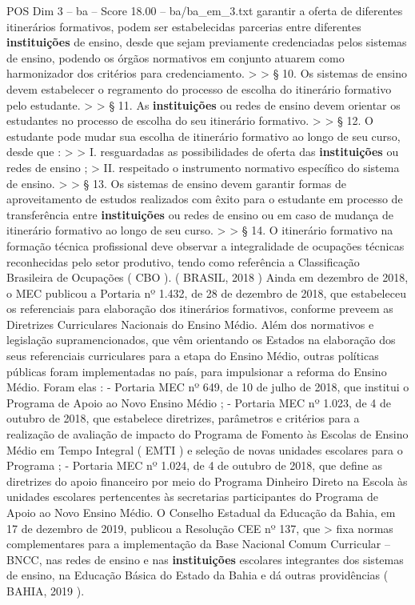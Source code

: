 \begin{textsample}{POS Dim 3 – ba – Score 18.00 – ba/ba\_em\_3.txt}
garantir a oferta de diferentes itinerários formativos, podem ser estabelecidas parcerias entre diferentes \textbf{instituições} de ensino, desde que sejam previamente credenciadas pelos sistemas de ensino, podendo os órgãos normativos em conjunto atuarem como harmonizador dos critérios para credenciamento. > > § 10.
Os sistemas de ensino devem estabelecer o regramento do processo de escolha do itinerário formativo pelo estudante. > > § 11.
As \textbf{instituições} ou redes de ensino devem orientar os estudantes no processo de escolha do seu itinerário formativo. > > § 12.
O estudante pode mudar sua escolha de itinerário formativo ao longo de seu curso, desde que : > > I. resguardadas as possibilidades de oferta das \textbf{instituições} ou redes de ensino ; > II. respeitado o instrumento normativo específico do sistema de ensino. > > § 13.
Os sistemas de ensino devem garantir formas de aproveitamento de estudos realizados com êxito para o estudante em processo de transferência entre \textbf{instituições} ou redes de ensino ou em caso de mudança de itinerário formativo ao longo de seu curso. > > § 14.
O itinerário formativo na formação técnica profissional deve observar a integralidade de ocupações técnicas reconhecidas pelo setor produtivo, tendo como referência a Classificação Brasileira de Ocupações ( CBO ). ( BRASIL, 2018 ) Ainda em dezembro de 2018, o MEC publicou a Portaria nº 1.432, de 28 de dezembro de 2018, que estabeleceu os referenciais para elaboração dos itinerários formativos, conforme preveem as Diretrizes Curriculares Nacionais do Ensino Médio.
Além dos normativos e legislação supramencionados, que vêm orientando os Estados na elaboração dos seus referenciais curriculares para a etapa do Ensino Médio, outras políticas públicas foram implementadas no país, para impulsionar a reforma do Ensino Médio.
Foram elas : - Portaria MEC nº 649, de 10 de julho de 2018, que institui o Programa de Apoio ao Novo Ensino Médio ; - Portaria MEC nº 1.023, de 4 de outubro de 2018, que estabelece diretrizes, parâmetros e critérios para a realização de avaliação de impacto do Programa de Fomento às Escolas de Ensino Médio em Tempo Integral ( EMTI ) e seleção de novas unidades escolares para o Programa ; - Portaria MEC nº 1.024, de 4 de outubro de 2018, que define as diretrizes do apoio financeiro por meio do Programa Dinheiro Direto na Escola às unidades escolares pertencentes às secretarias participantes do Programa de Apoio ao Novo Ensino Médio.
O Conselho Estadual da Educação da Bahia, em 17 de dezembro de 2019, publicou a Resolução CEE nº 137, que > fixa normas complementares para a implementação da Base Nacional Comum Curricular – BNCC, nas redes de ensino e nas \textbf{instituições} escolares integrantes dos sistemas de ensino, na Educação Básica do Estado da Bahia e dá outras providências ( BAHIA, 2019 ).

\end{textsample}
